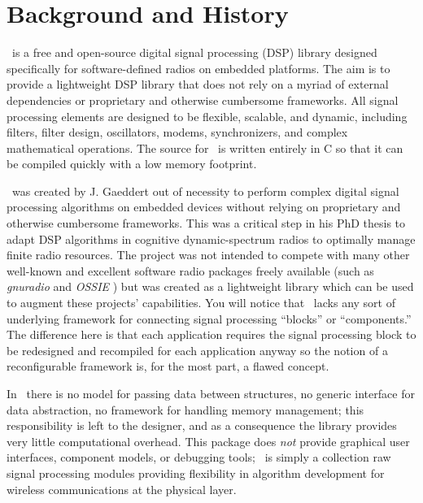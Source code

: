 %
%

\newpage
\section{Background and History}

\liquid\ is a free and open-source digital signal processing (DSP) library
designed specifically for software-defined radios on embedded platforms.
The aim is to provide a lightweight DSP library that does not rely on a myriad
of external dependencies or proprietary and otherwise cumbersome frameworks.
%
All signal processing elements are designed to be flexible, scalable, and
dynamic, including filters, filter design, oscillators, modems, synchronizers,
and complex mathematical operations.
The source for \liquid\ is written entirely in C so that it can be
compiled quickly with a low memory footprint.

\liquid\ was created by J. Gaeddert out of necessity to perform complex
digital signal processing algorithms on embedded devices
without relying on %
proprietary and otherwise cumbersome frameworks.
This was a critical step in his PhD thesis to adapt DSP algorithms in
cognitive dynamic-spectrum radios to optimally manage finite radio resources.
The project was not intended to compete with many other well-known and
excellent software radio packages freely available
(such as {\em gnuradio} \cite{gnuradio:web} and {\em OSSIE}
\cite{ossie:web})
but was created as a lightweight library which can be used to augment
these projects' capabilities.
You will notice that \liquid\ lacks any sort of underlying framework
for connecting signal processing ``blocks'' or ``components.''
The difference here is that each application requires the signal
processing block to be redesigned and recompiled for each application
anyway so the notion of a reconfigurable framework is, for the most
part, a flawed concept.

In \liquid\ there is
no model for passing data between structures,
no generic interface for data abstraction,
no framework for handling memory management;
this responsibility is left to the designer,
and as a consequence the library provides very little computational overhead.
This package does {\em not} provide
graphical user interfaces,
component models, or
debugging tools;
\liquid\ is simply a collection raw signal processing modules
providing flexibility in algorithm development for wireless
communications at the physical layer.


